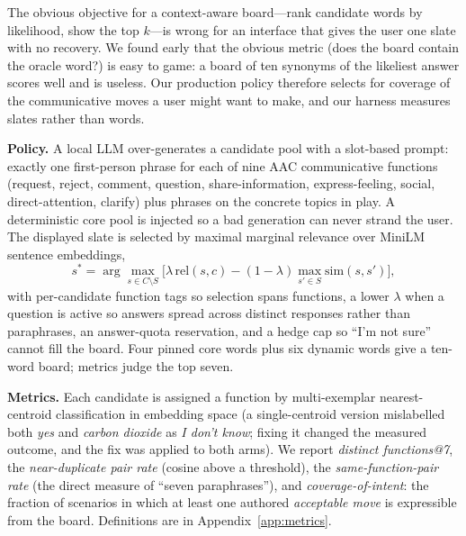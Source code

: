 \documentclass{article}
\newcommand{\fn}[1]{\texttt{#1}}
\begin{document}
The obvious objective for a context-aware board---rank candidate words by
likelihood, show the top $k$---is wrong for an interface that gives the user
one slate with no recovery. We found early that the obvious metric (does the
board contain the oracle word?) is easy to game: a board of ten synonyms of
the likeliest answer scores well and is useless. Our production policy
therefore selects for coverage of the communicative moves a user might want to
make, and our harness measures slates rather than words.

\textbf{Policy.} A local LLM over-generates a candidate pool with a slot-based
prompt: exactly one first-person phrase for each of nine AAC communicative
functions (request, reject, comment, question, share-information,
express-feeling, social, direct-attention, clarify) plus phrases on the concrete
topics in play. A deterministic core pool is injected so a bad generation can
never strand the user. The displayed slate is selected by maximal marginal
relevance \citep{mmr1998} over MiniLM \citep{minilm} sentence embeddings,
\begin{equation}
s^{*} = \arg\max_{s \in C \setminus S}
\Big[\lambda\,\mathrm{rel}(s, c) - (1-\lambda)\max_{s' \in S}\mathrm{sim}(s, s')\Big],
\end{equation}
with per-candidate function tags so selection spans functions, a lower
$\lambda$ when a question is active so answers spread across distinct responses
rather than paraphrases, an answer-quota reservation, and a hedge cap so
``I'm not sure'' cannot fill the board. Four pinned core words plus six dynamic
words give a ten-word board; metrics judge the top seven.

\textbf{Metrics.} Each candidate is assigned a function by multi-exemplar
nearest-centroid classification in embedding space (a single-centroid version
mislabelled both \emph{yes} and \emph{carbon dioxide} as \emph{I don't know};
fixing it changed the measured outcome, and the fix was applied to both arms).
We report \emph{distinct functions@7}, the \emph{near-duplicate pair rate}
(cosine above a threshold), the \emph{same-function-pair rate} (the direct
measure of ``seven paraphrases''), and \emph{coverage-of-intent}: the fraction
of scenarios in which at least one authored \emph{acceptable move} is
expressible from the board. Definitions are in Appendix~\ref{app:metrics}.

\end{document}

